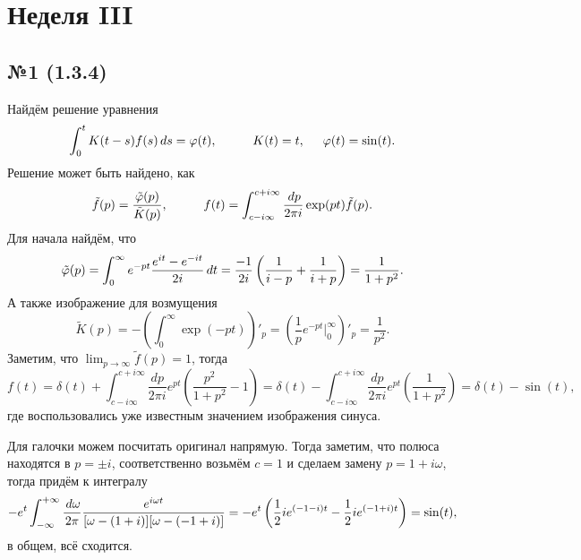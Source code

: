 
\section{Неделя III}

\subsection*{№1 (1.3.4)}


Найдём решение уравнения
\begin{equation*}
    \int_{0}^{t} K(t-s) f(s) \d s = \varphi(t),
    \hspace{10 mm} 
    K(t) = t,
    \hspace{5 mm}
    \varphi(t) = \sin (t).
\end{equation*}
Решение может быть найдено, как
\begin{equation*}
    \tilde{f}(p) = \frac{\tilde{\varphi}(p)}{\tilde{K}(p)},
    \hspace{10 mm} 
    f(t) = 
    \int_{c-i \infty}^{c+i \infty} \frac{\d p}{2 \pi i} \exp(pt) \tilde{f}(p).
\end{equation*}
Для начала найдём, что
\begin{equation*}
    \tilde{\varphi}(p) = \int_{0}^{\infty} e^{- p t} \frac{e^{i t} - e^{- i t}}{2 i} \, d t = 
    \frac{-1}{2i}\left(
        \frac{1}{i-p} + \frac{1}{i+p}
    \right) = \frac{1}{1+p^2}.
\end{equation*}
А также изображение для возмущения
\begin{equation*}
    \tilde{K}(p) = -\left(
        \int_{0}^{\infty} \exp\left(-p t\right) 
    \right)'_p = 
    \left(
        \frac{1}{p} e^{- pt} \big|_0^{\infty}
    \right)'_p = \frac{1}{p^2}.
\end{equation*}
Заметим, что $\lim_{p \to \infty} \tilde{f}(p) = 1$, тогда
\begin{equation*}
    f(t) = \delta(t) + \int_{c-i \infty}^{c+i \infty} \frac{d p}{2 \pi i} e^{pt} \left(
        \frac{p^2}{1+p^2}-1
    \right) = 
    \delta(t) - \int_{c-i \infty}^{c+i \infty} \frac{d p}{2 \pi i} e^{pt} \left(
        \frac{1}{1+p^2}
    \right) = \delta(t) - \sin (t),
\end{equation*}
где воспользовались уже известным значением изображения синуса. 

Для галочки можем посчитать оригинал напрямую. Тогда заметим, что полюса находятся в $p = \pm i$, соответственно возьмём $c = 1$ и сделаем замену $p = 1 + i \omega$, тогда придём к интегралу
\begin{equation*}
    - e^{t} \int_{-\infty}^{+\infty} \frac{\, d \omega}{2\pi} \frac{e^{i \omega t}}{[\omega - (1+i)][\omega-(-1+i)]}
    = - e^{t} \left(
        \frac{1}{2} i e^{(-1-i) t}-\frac{1}{2} i e^{(-1+i) t}
    \right) = \sin (t),
\end{equation*}
в общем, всё сходится.


